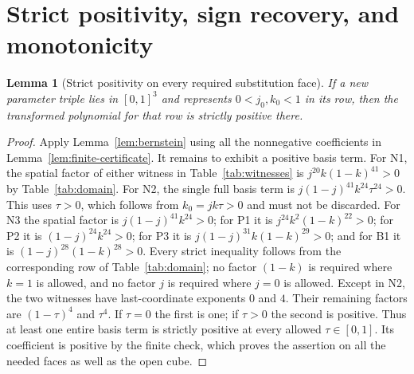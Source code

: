 \documentclass[11pt,a4paper]{article}
\newtheorem{lemma}{Lemma}[section]
\theoremstyle{definition}
\begin{document}
\section{Strict positivity, sign recovery, and monotonicity}
\begin{lemma}[Strict positivity on every required substitution face]\label{lem:chart-strict}
If a new parameter triple lies in $[0,1]^3$ and represents $0<j_0,k_0<1$ in its row, then the transformed polynomial for that row is strictly positive there.
\end{lemma}
\begin{proof}
Apply Lemma~\ref{lem:bernstein} using all the nonnegative coefficients in Lemma~\ref{lem:finite-certificate}. It remains to exhibit a positive basis term.
For N1, the spatial factor of either witness in Table~\ref{tab:witnesses} is $j^{20}k(1-k)^{41}>0$ by Table~\ref{tab:domain}. For N2, the single full basis term is $j(1-j)^{41}k^{24}\tau^{24}>0$. This uses $\tau>0$, which follows from $k_0=jk\tau>0$ and must not be discarded.
For N3 the spatial factor is $j(1-j)^{41}k^{24}>0$; for P1 it is $j^{24}k^2(1-k)^{22}>0$; for P2 it is $(1-j)^{24}k^{24}>0$; for P3 it is $j(1-j)^{31}k(1-k)^{29}>0$; and for B1 it is $(1-j)^{28}(1-k)^{28}>0$. Every strict inequality follows from the corresponding row of Table~\ref{tab:domain}; no factor $(1-k)$ is required where $k=1$ is allowed, and no factor $j$ is required where $j=0$ is allowed.
Except in N2, the two witnesses have last-coordinate exponents $0$ and $4$. Their remaining factors are $(1-\tau)^4$ and $\tau^4$. If $\tau=0$ the first is one; if $\tau>0$ the second is positive. Thus at least one entire basis term is strictly positive at every allowed $\tau\in[0,1]$. Its coefficient is positive by the finite check, which proves the assertion on all the needed faces as well as the open cube.
\end{proof}
\end{document}
